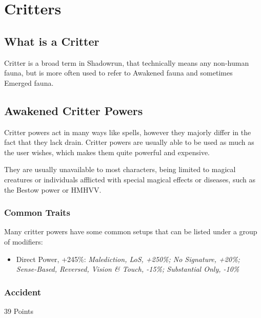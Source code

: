 \section{Critters}

\begin{multicols*}{3}
	
	\subsection{What is a Critter}
	
	Critter is a broad term in Shadowrun, that technically means any non-human fauna, but is more often used to refer to Awakened fauna and sometimes Emerged fauna.
	
	\subsection{Awakened Critter Powers}
	
	Critter powers act in many ways like spells, however they majorly differ in the fact that they lack drain. Critter powers are usually able to be used as much as the user wishes, which makes them quite powerful and expensive.
	
	They are usually unavailable to most characters, being limited to magical creatures or individuals afflicted with special magical effects or diseases, such as the Bestow power or HMHVV.
	
	\subsubsection{Common Traits}\label{cp_ct}
	
	Many critter powers have some common setups that can be listed under a group of modifiers:
	
	\begin{itemize}
		\itemsep 0pt
		\item Direct Power, +245\%: \textit{Malediction, LoS, +250\%; No Signature, +20\%; Sense-Based, Reversed, Vision \& Touch, -15\%; Substantial Only, -10\%}
	\end{itemize}
	
	\subsubsection{Accident}\label{accident}
	\begin{flushright}
		39 Points
	\end{flushright}
	

\end{multicols*}

